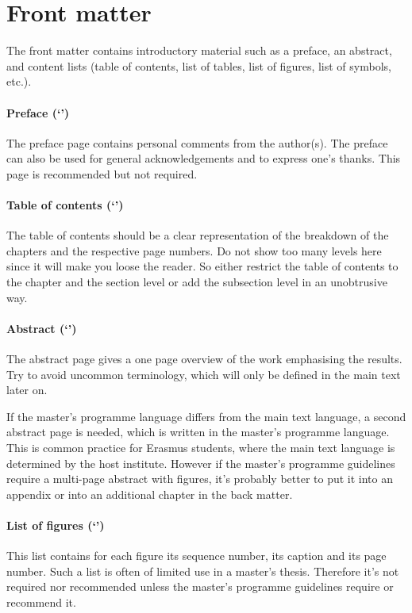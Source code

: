 \documentclass[11pt,article,oneside,british,extralanguage=dutch]{kulemt}
\newcommand\Dutch[1]{`{\selectlanguage{dutch}#1}'}
\begin{document}
\section{Front matter}
The front matter contains introductory material such as a preface, an
abstract, and content lists (table of contents, list of tables, list of
figures, list of symbols, etc.).

\paragraph{Preface (\Dutch{\prefacename})} The preface page contains personal
comments from the author(s). The preface can also be used for general
acknowledgements and to express one's thanks. This page is recommended but
not required.

\paragraph{Table of contents (\Dutch{\contentsname})} The table of contents
should be a clear representation of the breakdown of the chapters and the
respective page numbers. Do not show too many levels here since it will make
you loose the reader. So either restrict the table of contents to the
chapter and the section level or add the subsection level in an
unobtrusive way.

\paragraph{Abstract (\Dutch{\abstractname})} The abstract page gives a one
page overview of the work emphasising the results. Try to avoid uncommon
terminology, which will only be defined in the main text later on.

If the master's programme language differs from the main text language, a
second abstract page is needed, which is written in the master's programme
language. This is common practice for Erasmus students, where the main text
language is determined by the host institute. However if the master's programme
guidelines require a multi-page abstract with figures, it's probably better to
put it into an appendix or into an additional chapter in the back matter.

\paragraph{List of figures (\Dutch{\listfigurename})} This list contains for
each figure its sequence number, its caption and its page number. Such a list
is often of limited use in a master's thesis. Therefore it's not required nor
recommended unless the master's programme guidelines require or recommend it.
\end{document}
